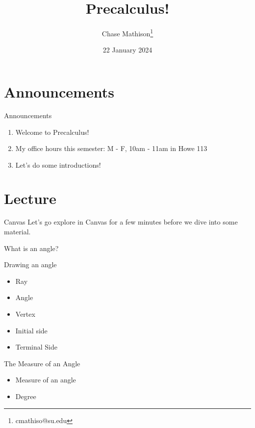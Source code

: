 \documentclass[presentation]{beamer}
\institute[SU]{Shenandoah University}
\author{Chase Mathison\thanks{cmathiso@su.edu}}
\date{22 January 2024}
\title{Precalculus!}
\begin{document}
\maketitle

\section{Announcements}
\label{sec:org8e08b18}
\begin{frame}[label={sec:org4e2dcae}]{Announcements}
\begin{enumerate}
\item Welcome to Precalculus!
\item My office hours this semester: M - F, 10am - 11am in Howe 113
\item Let's do some introductions!
\end{enumerate}
\end{frame}

\section{Lecture}
\label{sec:org254aad7}
\begin{frame}[label={sec:orgef44df6}]{Canvas}
Let's go explore in Canvas for a few minutes before we dive into some
material.
\end{frame}

\begin{frame}[label={sec:org7f28464}]{What is an angle?}
\end{frame}

\begin{frame}[label={sec:org72e2a07}]{Drawing an angle}
\begin{definition}[Terminology]
\begin{itemize}
\item Ray
\item Angle
\item Vertex
\item Initial side
\item Terminal Side
\end{itemize}
\end{definition}

\vspace{10in}
\end{frame}

\begin{frame}[label={sec:orge3cbc6a}]{The Measure of an Angle}
\begin{definition}[Terminology]
\begin{itemize}
\item Measure of an angle
\item Degree
\end{itemize}
\end{definition}
\vspace{10in}
\end{frame}
\end{document}

